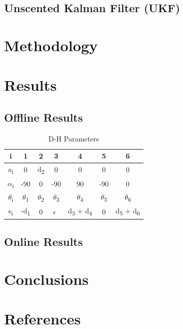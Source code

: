 \documentclass{article}
\begin{document}
\subsection{Unscented Kalman Filter (UKF)}

\section{Methodology}

\section{Results}
\subsection{Offline Results}

\begin{table}[h!]
\centering
\begin{tabular}{ |c |c  |c |c |c  |c  |c |}
\hline
	 i & 1 & 2 & 3 & 4 & 5 & 6 \\ \hline
	 a\textsubscript{i} & 0 & d\textsubscript{2} & 0 & 0 & 0 & 0 \\ \hline
	 $\alpha$\textsubscript{i}  & -90 & 0 & -90 & 90 & -90 & 0 \\ \hline
	 $\theta$\textsubscript{i} & $\theta$\textsubscript{1} & $\theta$\textsubscript{2} & $\theta$\textsubscript{3} & $\theta$\textsubscript{4} & $\theta$\textsubscript{5} & $\theta$\textsubscript{6} \\ \hline
	 s\textsubscript{i} & -d\textsubscript{1} & 0 & $\epsilon$\ &  d\textsubscript{3} + d\textsubscript{4} & 0 & d\textsubscript{5} + d\textsubscript{6} \\ \hline
\end{tabular}
\caption{D-H Parameters}
\label{table:1}
\end{table}

\subsection{Online Results}

\section{Conclusions}

\section{References}
\end{document}
